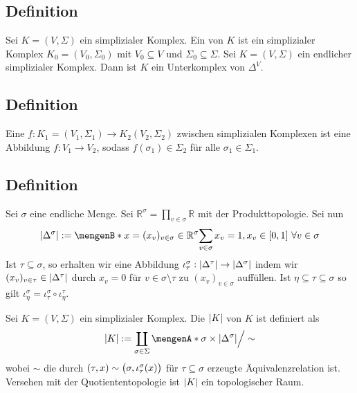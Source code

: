 \subsection[Definition: Unterkomplex]{Definition} %
\label{sub:24}
Sei $K=(V, \Sigma)$ ein simplizialer Komplex. Ein  von $K$ ist ein simplizialer Komplex $K_0 = (V_0, \Sigma_0)$ mit 
$V_0 \subseteq V$ und $\Sigma_0 \subseteq \Sigma$.
Sei $K=(V,\Sigma)$ ein endlicher simplizialer Komplex. Dann ist $K$ ein Unterkomplex von $\Delta^V$.

\subsection[Definition: Simpliziale Abbildung]{Definition} %
\label{sub:25}
Eine  $f : K_1=(V_1, \Sigma_1) \to K_2(V_2, \Sigma_2)$ zwischen simplizialen Komplexen ist eine Abbildung $f : V_1 \to V_2$, sodass 
$f(\sigma_1) \in \Sigma_2$ für alle $\sigma_1 \in \Sigma_1$. 

\subsection[Definition: Geometrische Realisierung]{Definition} %
\label{sub:26}
Sei $\sigma$ eine endliche Menge. Sei $\mathds{R}^\sigma = \prod_{v \in \sigma} \mathds{R}$ mit der Produkttopologie. Sei nun 
\[
	\abs*{\Delta^\sigma} := \set[x=(x_v)_{v \in \sigma} \in \mathds{R}^\sigma]{\sum_{v \in \sigma}x_v = 1 , x_v \in [0,1] \,\, \forall v \in \sigma}  
\]
Ist $\tau \subseteq \sigma$, so erhalten wir eine Abbildung $\iota_\tau^\sigma : \abs*{\Delta^\tau}  \to \abs*{\Delta^\sigma}$ indem wir 
$(x_v)_{v \in \tau} \in \abs*{\Delta^\tau}$ durch $x_v=0$ für $v \in \sigma \setminus \tau$ zu $(x_v)_{v \in \sigma}$ auffüllen. Ist $\eta \subseteq \tau \subseteq \sigma$ 
so gilt $\iota^\sigma_\eta = \iota_\tau^\sigma \circ  \iota_\eta^\tau$.

\noindent Sei $K=(V, \Sigma)$ ein simplizialer Komplex. Die  $\abs*{K}$ von $K$ ist definiert als 
\[
	\abs*{K} := \coprod_{\sigma \in \Sigma} \set{\sigma} \times \abs*{\Delta^\sigma} \Big/ \sim
\] 
wobei $\sim$ die durch $(\tau, x) \sim \enbrace[\big]{\sigma, \iota_\tau^\sigma(x)}$ für $\tau \subseteq \sigma$ erzeugte Äquivalenzrelation ist. Versehen mit der 
Quotiententopologie ist $\abs*{K}$ ein topologischer Raum.

